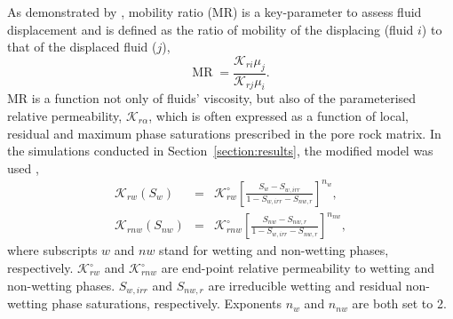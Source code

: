 \documentclass[preprint,authoryear,12pt]{elsarticle}
\newcommand{\frc}{\displaystyle\frac}
\begin{document}

\medskip
As demonstrated by \citet{habermann_1960} \citep[see also][]{budek_2017}, mobility ratio (MR) is a key-parameter to assess fluid displacement and is defined as the ratio of mobility of the displacing (fluid $i$) to that of the displaced fluid ($j$),
\begin{equation}
 \text{MR} \; = \frac{\mathcal{K}_{ri} \mu_{j}}{\mathcal{K}_{rj} \mu_{i}}. 
\label{eq:MR}
\end{equation}
MR is a function not only of fluids' viscosity, but also of the parameterised relative permeability, $\mathcal{K}_{r\alpha}$, which is often expressed as a function of local, residual and maximum phase saturations prescribed in the pore rock matrix. In the simulations conducted in Section~\ref{section:results}, the modified \cite{Brooks_1964} model was used \citep{alpak_1999},
\begin{eqnarray}
  \mathcal{K}_{rw}\left(S_{w}\right) &=& \mathcal{K}^{\circ}_{rw}\left[\frc{S_{w}-S_{w,irr}}{1-S_{w,irr}-S_{nw,r}}\right]^{n_{w}}, \label{Eqn:CoreyBrooks1}\\
  \mathcal{K}_{rnw}\left(S_{nw}\right) &=& \mathcal{K}^{\circ}_{rnw}\left[\frc{S_{nw}-S_{nw,r}}{1-S_{w,irr}-S_{nw,r}}\right]^{n_{nw}}, \label{Eqn:CoreyBrooks2}
\end{eqnarray}
where subscripts $w$ and $nw$ stand for wetting and non-wetting phases, respectively. $\mathcal{K}^{\circ}_{rw}$ and $\mathcal{K}^{\circ}_{rnw}$ are end-point relative permeability to wetting and non-wetting phases. $S_{w,irr}$ and $S_{nw,r}$ are irreducible wetting and residual non-wetting phase saturations, respectively. Exponents $n_{w}$ and $n_{nw}$ are both set to 2. 
\end{document}
